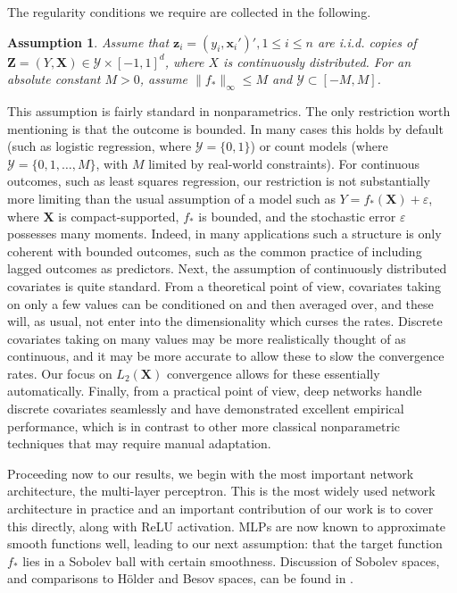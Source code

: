 \documentclass[11pt]{article}
\newtheorem{assumption}{Assumption}
\numberwithin{equation}{section}
\theoremstyle{definition}
\newcommand{\bz}{\bm{z}}
\newcommand{\bZ}{\bm{Z}}
\newcommand{\bx}{\bm{x}}
\newcommand{\bX}{\bm{X}}
\begin{document}
The regularity conditions we require are collected in the following. 
\begin{assumption}
	\label{asmpt:dgp}
	Assume that $\bz_i = (y_i, \bx_i')', 1\leq i \leq n$ are i.i.d. copies of $\bZ = (Y, \bX) \in \mathcal{Y} \times [-1,1]^d$, where $X$ is continuously distributed. For an absolute constant $M>0$, assume $\| f_* \|_\infty \leq M$ and $\mathcal{Y} \subset [-M,M]$.
\end{assumption}


This assumption is fairly standard in nonparametrics. The only restriction worth mentioning is that the outcome is bounded. In many cases this holds by default (such as logistic regression, where $\mathcal{Y} = \{0,1\}$) or count models (where $\mathcal{Y} = \{0,1,\ldots,M\}$, with $M$ limited by real-world constraints). For continuous outcomes, such as least squares regression, our restriction is not substantially more limiting than the usual assumption of a model such as $Y = f_*(\bX) + \varepsilon$, where $\bX$ is compact-supported, $f_*$ is bounded, and the stochastic error $\varepsilon$ possesses many moments. Indeed, in many applications such a structure is only coherent with bounded outcomes, such as the common practice of including lagged outcomes as predictors. Next, the assumption of continuously distributed covariates is quite standard. From a theoretical point of view, covariates taking on only a few values can be conditioned on and then averaged over, and these will, as usual, not enter into the dimensionality which curses the rates. Discrete covariates taking on many values may be more realistically thought of as continuous, and it may be more accurate to allow these to slow the convergence rates. Our focus on $L_2(\bX)$ convergence allows for these essentially automatically. Finally, from a practical point of view, deep networks handle discrete covariates seamlessly and have demonstrated excellent empirical performance, which is in contrast to other more classical nonparametric techniques that may require manual adaptation.


Proceeding now to our results, we begin with the most important network architecture, the multi-layer perceptron. This is the most widely used network architecture in practice and an important contribution of our work is to cover this directly, along with ReLU activation. MLPs are now known to approximate smooth functions well, leading to our next assumption: that the target function $f_*$ lies in a Sobolev ball with certain smoothness. Discussion of Sobolev spaces, and comparisons to H\"older and Besov spaces, can be found in \cite{Gine-Nickl2016_book}.  
\end{document}
